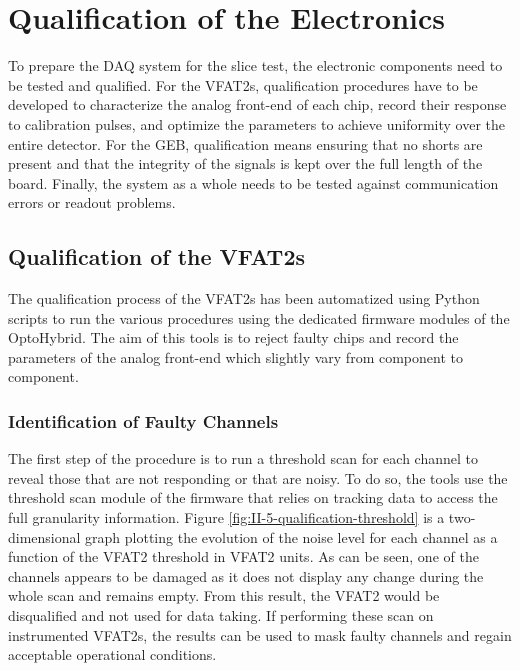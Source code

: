 \chapter{Qualification of the Electronics}
\label{chap:II-5-qualification}

  To prepare the DAQ system for the slice test, the electronic components need to be tested and qualified. For the VFAT2s, qualification procedures have to be developed to characterize the analog front-end of each chip, record their response to calibration pulses, and optimize the parameters to achieve uniformity over the entire detector. For the GEB, qualification means ensuring that no shorts are present and that the integrity of the signals is kept over the full length of the board. Finally, the system as a whole needs to be tested against communication errors or readout problems.

  \section{Qualification of the VFAT2s}

    The qualification process of the VFAT2s has been automatized using Python scripts to run the various procedures using the dedicated firmware modules of the OptoHybrid. The aim of this tools is to reject faulty chips and record the parameters of the analog front-end which slightly vary from component to component.

    \subsection{Identification of Faulty Channels}

      The first step of the procedure is to run a threshold scan for each channel to reveal those that are not responding or that are noisy. To do so, the tools use the threshold scan module of the firmware that relies on tracking data to access the full granularity information. Figure \ref{fig:II-5-qualification-threshold} is a two-dimensional graph plotting the evolution of the noise level for each channel as a function of the VFAT2 threshold in VFAT2 units. As can be seen, one of the channels appears to be damaged as it does not display any change during the whole scan and remains empty. From this result, the VFAT2 would be disqualified and not used for data taking. If performing these scan on instrumented VFAT2s, the results can be used to mask faulty channels and regain acceptable operational conditions.

